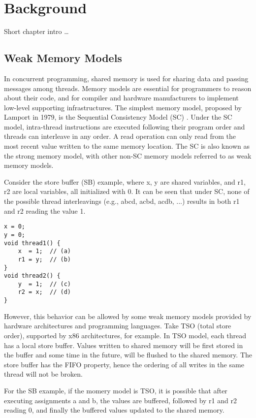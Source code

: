 \chapter{\label{cha:title}Background}

Short chapter intro \ldots

\section{Weak Memory Models}

In concurrent programming, shared memory is used for sharing data and passing messages among threads. Memory models are essential for programmers to reason about their code, and for compiler and hardware manufacturers to implement low-level supporting infrastructures. The simplest memory model, proposed by Lamport\cite{SC} in 1979, is the Sequential Consistency Model (SC) . Under the SC model, intra-thread instructions are executed following their program order and threads can interleave in any order. A read operation can only read from the most recent value written to the same memory location. The SC is also known as the strong memory model, with other non-SC memory models referred to as weak memory models.

Consider the store buffer (SB) example, where x, y are shared variables, and r1, r2 are local variables, all initialized with 0. It can be seen that under SC, none of the possible thread interleavings (e.g., abcd, acbd, acdb, ...) results in both r1 and r2 reading the value 1.


\begin{lstlisting}
x = 0;
y = 0;
void thread1() {
    x  = 1;  // (a) 
    r1 = y;  // (b)
}
void thread2() {
    y  = 1;  // (c)
    r2 = x;  // (d)
}
\end{lstlisting}

However, this behavior can be allowed by some weak memory models provided by hardware architectures and programming languages. Take TSO (total store order)\cite{TSO}, supported by x86 architectures, for example. In TSO model, each thread has a local store buffer. Values written to shared memory will be first stored in the buffer and some time in the future, will be flushed to the shared memory. The store buffer has the FIFO property, hence the ordering of all writes in the same thread will not be broken. 

For the SB example, if the momery model is TSO, it is possible that after executing assignments a and b, the values are buffered, followed by r1 and r2 reading 0, and finally the buffered values updated to the shared memory. 

